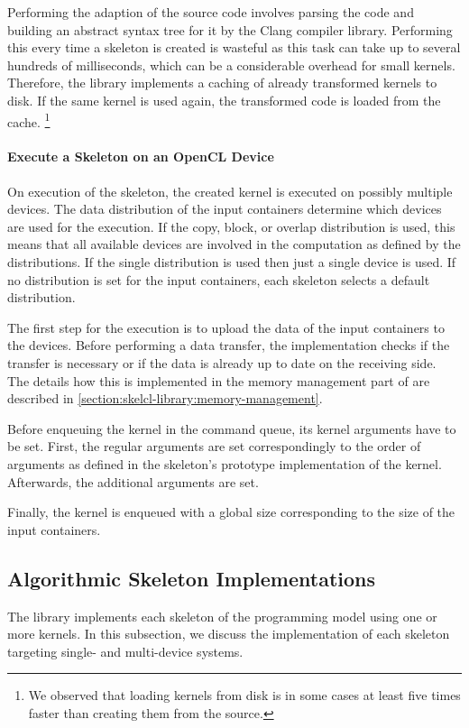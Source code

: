 Performing the adaption of the source code involves parsing the code and building an abstract syntax tree for it by the Clang compiler library.
Performing this every time a skeleton is created is wasteful as this task can take up to several hundreds of milliseconds, which can be a considerable overhead for small kernels.
Therefore, the \SkelCL library implements a caching of already transformed kernels to disk.
If the same kernel is used again, the transformed code is loaded from the cache.%
\footnote{We observed that loading kernels from disk is in some cases at least five times faster than creating them from the source.}


\paragraph{Execute a Skeleton on an OpenCL Device}
On execution of the skeleton, the created \OpenCL kernel is executed on possibly multiple \OpenCL devices.
The data distribution of the input containers determine which \OpenCL devices are used for the execution.
If the copy, block, or overlap distribution is used, this means that all available devices are involved in the computation as defined by the distributions.
If the single distribution is used then just a single device is used.
If no distribution is set for the input containers, each skeleton selects a default distribution.

The first step for the execution is to upload the data of the input containers to the \OpenCL devices.
Before performing a data transfer, the \SkelCL implementation checks if the transfer is necessary or if the data is already up to date on the receiving side.
The details how this is implemented in the memory management part of \SkelCL are described in \autoref{section:skelcl-library:memory-management}.

Before enqueuing the \OpenCL kernel in the \OpenCL command queue, its kernel arguments have to be set.
First, the regular arguments are set correspondingly to the order of arguments as defined in the skeleton's prototype implementation of the \OpenCL kernel.
Afterwards, the additional arguments are set.

Finally, the \OpenCL kernel is enqueued with a global size corresponding to the size of the input containers.










\subsection{Algorithmic Skeleton Implementations}
\label{section:skelcl-library:skeletons}
The \SkelCL library implements each skeleton of the \SkelCL programming model using one or more \OpenCL kernels.
In this subsection, we discuss the implementation of each skeleton targeting single- and multi-device systems.





